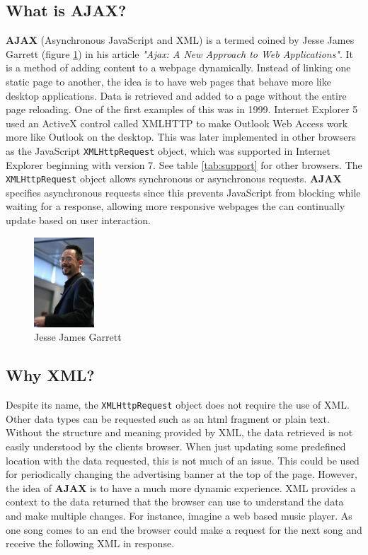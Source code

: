 \documentclass[10pt,a4paper]{article}
\begin{document}
\subsection{What is AJAX?}
\textbf{AJAX} (Asynchronous JavaScript and XML) is a termed coined by Jesse James Garrett (figure \ref{fig:jjg}) in his article \textit{"Ajax: A New Approach to Web Applications"}\cite{JJG:AJAX}. It is a method of adding content to a webpage dynamically. Instead of linking one static page to another, the idea is to have web pages that behave more like desktop applications. Data is retrieved and added to a page without the entire page reloading. One of the first examples of this was in 1999. Internet Explorer 5 used an ActiveX control called XMLHTTP to make Outlook Web Access work more like Outlook on the desktop\cite{Wiki:XML}. This was later implemented in other browsers as the JavaScript \texttt{XMLHttpRequest} object, which was supported in Internet Explorer beginning with version 7\cite{MDN:XML}. See table \ref{tab:support} for other browsers. The \texttt{XMLHttpRequest} object allows synchronous or asynchronous requests\cite{MDN:XML}. \textbf{AJAX} specifies asynchronous requests since this prevents JavaScript from blocking while waiting for a response, allowing more responsive webpages the can continually update based on user interaction.
\begin{figure}[h]
	\centering
	\includegraphics[width=0.2\textwidth]{jjg.jpg}
	\caption{Jesse James Garrett\cite{JJG:Photo}}
	\label{fig:jjg}
\end{figure}
\subsection{Why XML?}
Despite its name, the \texttt{XMLHttpRequest} object does not require the use of XML\cite{MDN:XML}. Other data types can be requested such as an html fragment or plain text. Without the structure and meaning provided by XML, the data retrieved is not easily understood by the clients browser. When just updating some predefined location with the data requested, this is not much of an issue. This could be used for periodically changing the advertising banner at the top of the page. However, the idea of \textbf{AJAX} is to have a much more dynamic experience. XML provides a context to the data returned that the browser can use to understand the data and make multiple changes. For instance, imagine a web based music player. As one song comes to an end the browser could make a request for the next song and receive the following XML in response.
\end{document}
